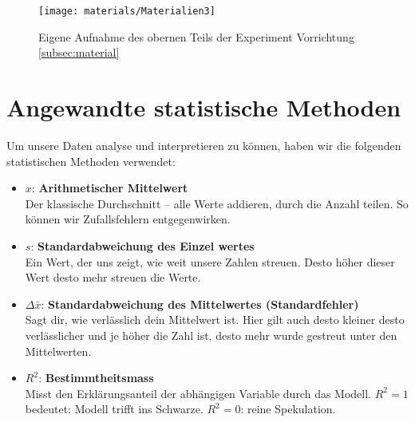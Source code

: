 \documentclass[../main.tex]{subfiles} %
\begin{document}
            \begin{figure}[H]
                \centering
                \texttt{[image: materials/Materialien3]}
                \caption{Eigene Aufnahme des obernen Teils der Experiment Vorrichtung  \ref{subsec:material}}
                \label{fig:material3}
            \end{figure}

    \section{Angewandte statistische Methoden}\label{sec:angewandte-statistische-methoden}
        Um unsere Daten analyse und interpretieren zu können, haben wir die folgenden statistischen Methoden verwendet:
        \begin{itemize}
            \item $x$: \textbf{Arithmetischer Mittelwert} \\
            \quad Der klassische Durchschnitt – alle Werte addieren, durch die Anzahl teilen.
                  So können wir Zufallsfehlern entgegenwirken.

            \item $s$: \textbf{Standardabweichung des Einzel    wertes} \\
            \quad Ein Wert, der uns zeigt, wie weit unsere Zahlen streuen.
                  Desto höher dieser Wert desto mehr streuen die Werte.

            \item $\Delta \bar{x}$: \textbf{Standardabweichung des Mittelwertes (Standardfehler)} \\
            \quad Sagt dir, wie verlässlich dein Mittelwert ist.
                  Hier gilt auch desto kleiner desto verlässlicher und je höher die Zahl ist, desto mehr wurde gestreut unter den Mittelwerten.

            \item $R^2$: \textbf{Bestimmtheitsmass} \\
            \quad Misst den Erklärungsanteil der abhängigen Variable durch das Modell. $R^2 = 1$ bedeutet: Modell trifft ins Schwarze. $R^2 = 0$: reine Spekulation.
        \end{itemize}
\end{document}
